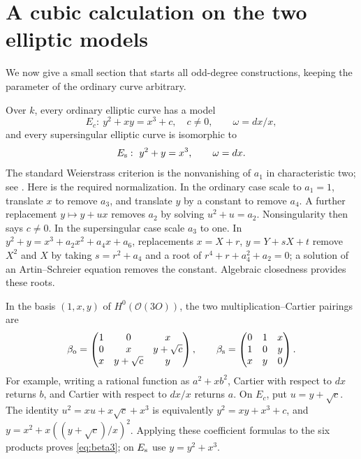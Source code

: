\documentclass[11pt]{article}
\theoremstyle{definition}\newtheorem{definition}[theorem]{Definition}
\theoremstyle{remark}\newtheorem{remark}[theorem]{Remark}
\newcommand{\OO}{\mathcal O}
\begin{document}
\section{A cubic calculation on the two elliptic models}\label{sec:cubic}

We now give a small section that starts all odd-degree constructions, keeping the parameter of the ordinary curve arbitrary.

Over $k$, every ordinary elliptic curve has a model
\[
 E_c:\ y^2+xy=x^3+c,\quad c\ne0,\qquad \omega=dx/x,
\]
and every supersingular elliptic curve is isomorphic to
\[
 E_{\rm s}:\ y^2+y=x^3,\qquad \omega=dx.
\]
The standard Weierstrass criterion is the nonvanishing of $a_1$ in characteristic two; see \citet[Example~5.26, p.~82]{EGM}. Here is the required normalization. In the ordinary case scale to $a_1=1$, translate $x$ to remove $a_3$, and translate $y$ by a constant to remove $a_4$. A further replacement $y\mapsto y+ux$ removes $a_2$ by solving $u^2+u=a_2$. Nonsingularity then says $c\ne0$. In the supersingular case scale $a_3$ to one. In $y^2+y=x^3+a_2x^2+a_4x+a_6$, replacements $x=X+r$, $y=Y+sX+t$ remove $X^2$ and $X$ by taking $s=r^2+a_4$ and a root of $r^4+r+a_4^2+a_2=0$; a solution of an Artin--Schreier equation removes the constant. Algebraic closedness provides these roots.

In the basis $(1,x,y)$ of $H^0(\OO(3O))$, the two multiplication--Cartier pairings are
\begin{equation}\label{eq:beta3}
 \beta_{\rm o}=
 \begin{pmatrix}1&0&x\\0&x&y+\sqrt c\\x&y+\sqrt c&y\end{pmatrix},
 \qquad
 \beta_{\rm s}=
 \begin{pmatrix}0&1&x\\1&0&y\\x&y&0\end{pmatrix}.
\end{equation}
For example, writing a rational function as $a^2+xb^2$, Cartier with respect to $dx$ returns $b$, and Cartier with respect to $dx/x$ returns $a$. On $E_c$, put $u=y+\sqrt c$. The identity $u^2=xu+x\sqrt c+x^3$ is equivalently $y^2=xy+x^3+c$, and $y=x^2+x((y+\sqrt c)/x)^2$. Applying these coefficient formulas to the six products proves \eqref{eq:beta3}; on $E_{\rm s}$ use $y=y^2+x^3$.
\end{document}
